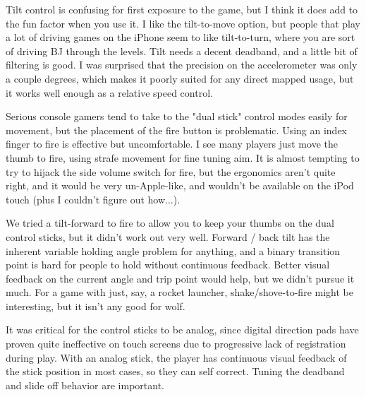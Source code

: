 \documentclass[book.tex]{subfiles}
\begin{document}
Tilt control is confusing for first exposure to the game, but I think it does add to the fun factor when you use it.  I like the tilt-to-move option, but people that play a lot of driving games on the iPhone seem to like tilt-to-turn, where you are sort of driving BJ through the levels.  Tilt needs a decent deadband, and a little bit of filtering is good.  I was surprised that the precision on the accelerometer was only a couple degrees, which makes it poorly suited for any direct mapped usage, but it works well enough as a relative speed control.\\
\par

Serious console gamers tend to take to the "dual stick" control modes easily for movement, but the placement of the fire button is problematic.  Using an index finger to fire is effective but uncomfortable.  I see many players just move the thumb to fire, using strafe movement for fine tuning aim.  It is almost tempting to try to hijack the side volume switch for fire, but the ergonomics aren't quite right, and it would be very un-Apple-like, and wouldn't be available on the iPod touch (plus I couldn't figure out how...).\\
\par

We tried a tilt-forward to fire to allow you to keep your thumbs on the dual control sticks, but it didn't work out very well.  Forward / back tilt has the inherent variable holding angle problem for anything, and a binary transition point is hard for people to hold without continuous feedback.  Better visual feedback on the current angle and trip point would help, but we didn't pursue it much.  For a game with just, say, a rocket launcher, shake/shove-to-fire might be interesting, but it isn't any good for wolf.\\
\par

It was critical for the control sticks to be analog, since digital direction pads have proven quite ineffective on touch screens due to progressive lack of registration during play.  With an analog stick, the player has continuous visual feedback of the stick position in most cases, so they can self correct.  Tuning the deadband and slide off behavior are important.\\
\par
\end{document}
